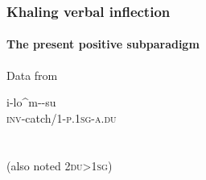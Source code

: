 \begin{frame} 
\frametitle{Khaling verbal inflection}
\framesubtitle{The present positive subparadigm}

Data from \cite{jacques12khaling}

\begin{center}\small
{{\textglotstop}i-{lo\^{\textopeno}m}-{\ng}{\textturnv}-su}\\
\textsc{inv}-catch/\textsc{1}-\textsc{p.1sg}-\textsc{a.du}\\
\\

~\\
(also noted \textsc{2du>1sg})
\end{center}

\begin{table}[H]
\end{table}
\end{frame}
